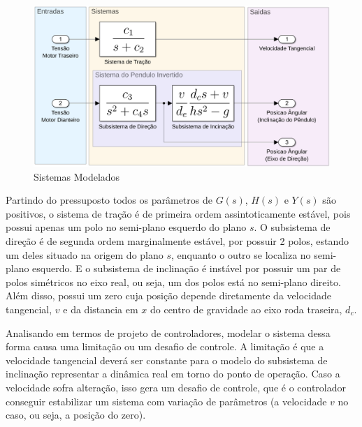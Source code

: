         \begin{figure}[h]
            \centering
            \includegraphics[width=15cm]{Imagens/sistemasFINAL.png}
            \caption{Sistemas Modelados}
            \label{img:ModelagemFinal}
        \end{figure}
        
        Partindo do pressuposto todos os parâmetros de $G(s)$, $H(s)$ e $Y(s)$ são positivos, o sistema de tração é de primeira ordem assintoticamente estável, pois possui apenas um polo no semi-plano esquerdo do plano $s$. O subsistema de direção é de segunda ordem marginalmente estável, por possuir 2 polos, estando um deles situado na origem do plano $s$, enquanto o outro se localiza no semi-plano esquerdo. E o subsistema de inclinação é instável por possuir um par de polos simétricos no eixo real, ou seja, um dos polos está no semi-plano direito. Além disso, possui um zero cuja posição depende diretamente da velocidade tangencial, $v$ e da distancia em $x$ do centro de gravidade ao eixo roda traseira, $d_c$.
        
        Analisando em termos de projeto de controladores, modelar o sistema dessa forma causa uma limitação ou um desafio de controle. A limitação é que a velocidade tangencial deverá ser constante para o modelo do subsistema de inclinação representar a dinâmica real em torno do ponto de operação. Caso a velocidade sofra alteração, isso gera um desafio de controle, que é o controlador conseguir estabilizar um sistema com variação de parâmetros (a velocidade $v$ no caso, ou seja, a posição do zero).
        